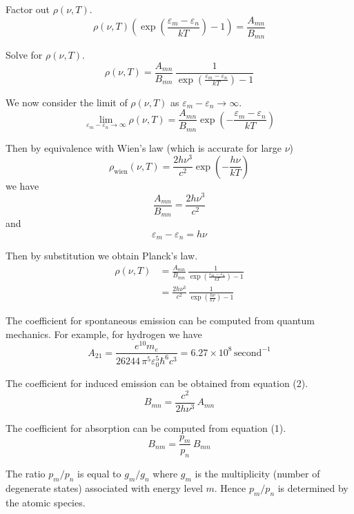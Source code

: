 \documentclass[12pt]{article}
\newcommand\BNM{B_{nm}} %
\newcommand\BMN{B_{mn}} %
\newcommand\AMN{A_{mn}} %
\newcommand\RHO{\rho(\nu,T)}
\begin{document}
\noindent
Factor out $\RHO$.
\begin{equation*}
\RHO\left(\exp\left(\frac{\varepsilon_m-\varepsilon_n}{kT}\right)-1\right)
=\frac{\AMN}{\BMN}
\end{equation*}

\noindent
Solve for $\RHO$.
\begin{equation*}
\RHO
=\frac{\AMN}{\BMN}\,\frac{1}{\exp\left(\frac{\varepsilon_m-\varepsilon_n}{kT}\right)-1}
\end{equation*}

\noindent
We now consider the limit of $\RHO$ as $\varepsilon_m-\varepsilon_n\rightarrow\infty$.
\begin{equation*}
\lim_{\varepsilon_m-\varepsilon_n\rightarrow\infty}\RHO
=\frac{\AMN}{\BMN}\exp\left(-\frac{\varepsilon_m-\varepsilon_n}{kT}\right)
\end{equation*}

\noindent
Then by equivalence with Wien's law (which is accurate for large $\nu$)
\begin{equation*}
\rho_\text{wien}(\nu,T)=\frac{2h\nu^3}{c^2}\exp\left(-\frac{h\nu}{kT}\right)
\end{equation*}
we have
\begin{equation*}
\frac{\AMN}{\BMN}=\frac{2h\nu^3}{c^2}
\tag{2}
\end{equation*}
and
\begin{equation*}
\varepsilon_m-\varepsilon_n=h\nu
\end{equation*}

\noindent
Then by substitution we obtain Planck's law.
\begin{align*}
\RHO
&=\frac{\AMN}{\BMN}\,\frac{1}{\exp\left(\frac{\varepsilon_m-\varepsilon_n}{kT}\right)-1}
\\[2ex]
&=\frac{2h\nu^3}{c^2}\,\frac{1}{\exp\left(\frac{h\nu}{kT}\right)-1}
\end{align*}

\bigskip
\noindent
The coefficient for spontaneous emission can be computed from quantum mechanics.
For example, for hydrogen we have
\begin{equation*}
A_{21}=\frac{e^{10}m_e}{26244\,\pi^5\varepsilon_0^5\hbar^6 c^3}
=6.27\times10^8\,\text{second}^{-1}
\end{equation*}

\noindent
The coefficient for induced emission can be obtained from equation (2).
\begin{equation*}
\BMN=\frac{c^2}{2h\nu^3}\,\AMN
\end{equation*}

\noindent
The coefficient for absorption can be computed from equation (1).
\begin{equation*}
\BNM=\frac{p_m}{p_n}\,\BMN
\end{equation*}

\noindent
The ratio $p_m/p_n$ is equal to $g_m/g_n$
where $g_m$ is the multiplicity (number of degenerate states)
associated with energy level $m$.
Hence $p_m/p_n$ is determined by the atomic species.
\end{document}
